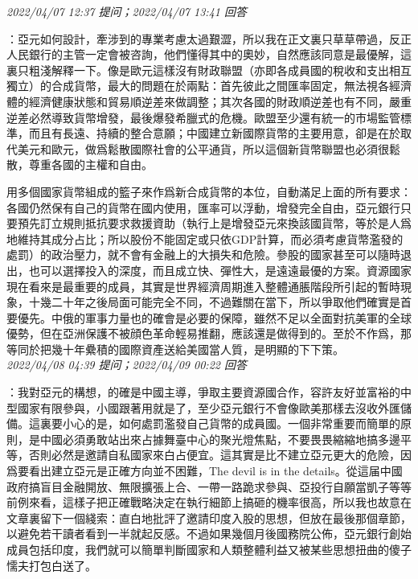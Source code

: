 \documentclass[twocolumn]{ctexart}
\begin{document}
\textit{\hfill\noindent\small 2022/04/07 12:37 提问；2022/04/07 13:41 回答}

：亞元如何設計，牽涉到的專業考慮太過艱澀，所以我在正文裏只草草帶過，反正人民銀行的主管一定會被咨詢，他們懂得其中的奧妙，自然應該同意是最優解，這裏只粗淺解釋一下。像是歐元這樣沒有財政聯盟（亦即各成員國的稅收和支出相互獨立）的合成貨幣，最大的問題在於兩點：首先彼此之間匯率固定，無法視各經濟體的經濟健康狀態和貿易順逆差來做調整；其次各國的財政順逆差也有不同，嚴重逆差必然導致貨幣增發，最後爆發希臘式的危機。歐盟至少還有統一的市場監管標準，而且有長遠、持續的整合意願；中國建立新國際貨幣的主要用意，卻是在於取代美元和歐元，做爲鬆散國際社會的公平通貨，所以這個新貨幣聯盟也必須很鬆散，尊重各國的主權和自由。

用多個國家貨幣組成的籃子來作爲新合成貨幣的本位，自動滿足上面的所有要求：各國仍然保有自己的貨幣在國内使用，匯率可以浮動，增發完全自由，亞元銀行只要預先訂立規則抵抗要求救援資助（執行上是增發亞元來換該國貨幣，等於是人爲地維持其成分占比；所以股份不能固定或只依GDP計算，而必須考慮貨幣濫發的處罰）的政治壓力，就不會有金融上的大損失和危險。參股的國家甚至可以隨時退出，也可以選擇投入的深度，而且成立快、彈性大，是遠遠最優的方案。資源國家現在看來是最重要的成員，其實是世界經濟周期進入整體通脹階段所引起的暫時現象，十幾二十年之後局面可能完全不同，不過難關在當下，所以爭取他們確實是首要優先。中俄的軍事力量也的確會是必要的保障，雖然不足以全面對抗美軍的全球優勢，但在亞洲保護不被顔色革命輕易推翻，應該還是做得到的。至於不作爲，那等同於把幾十年纍積的國際資產送給美國當人質，是明顯的下下策。
\\

\textit{\hfill\noindent\small 2022/04/08 04:39 提问；2022/04/09 00:22 回答}

：我對亞元的構想，的確是中國主導，爭取主要資源國合作，容許友好並富裕的中型國家有限參與，小國跟著用就是了，至少亞元銀行不會像歐美那樣去沒收外匯儲備。這裏要小心的是，如何處罰濫發自己貨幣的成員國。一個非常重要而簡單的原則，是中國必須勇敢站出來占據舞臺中心的聚光燈焦點，不要畏畏縮縮地搞多邊平等，否則必然是邀請自私國家來白占便宜。這其實是比不建立亞元更大的危險，因爲要看出建立亞元是正確方向並不困難，The devil is in the details。從這届中國政府搞盲目金融開放、無限擴張上合、一帶一路跪求參與、亞投行自願當凱子等等前例來看，這樣子把正確戰略決定在執行細節上搞砸的機率很高，所以我也故意在文章裏留下一個綫索：直白地批評了邀請印度入股的思想，但放在最後那個章節，以避免若干讀者看到一半就起反感。不過如果幾個月後國務院公佈，亞元銀行創始成員包括印度，我們就可以簡單判斷國家和人類整體利益又被某些思想扭曲的傻子懦夫打包白送了。
\end{document}
